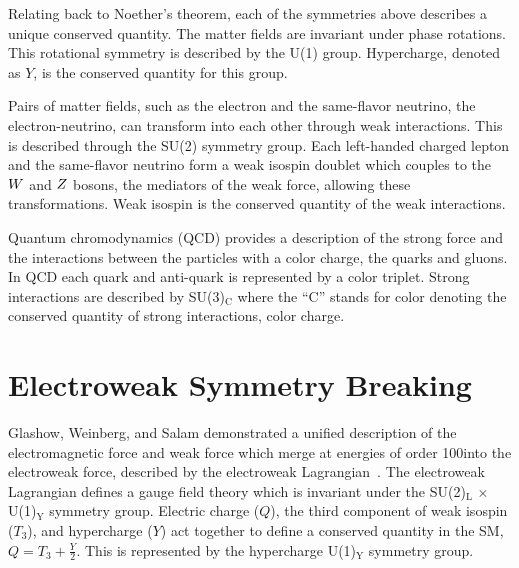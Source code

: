 
Relating back to Noether's theorem, each of the symmetries above describes a unique conserved
quantity. The matter fields are invariant under phase rotations. This rotational symmetry is described by the U(1) group.
Hypercharge, denoted as $Y$, is the conserved quantity for this group.

Pairs of matter fields, such as the electron and the same-flavor neutrino, the electron-neutrino, can transform into each other 
through weak interactions. This is described through the SU(2) symmetry group. Each left-handed charged lepton 
and the same-flavor neutrino form a weak isospin doublet which
couples to the $W$ and $Z$ bosons, the mediators of the weak force, allowing these transformations.
Weak isospin is the conserved quantity of the weak interactions.

Quantum chromodynamics (QCD) provides a description of the strong force and the interactions
between the particles with a color charge, the quarks and gluons. In QCD each quark and anti-quark
is represented by a color triplet. Strong interactions are described by SU(3)$_{\text{C}}$
where the ``C'' stands for color denoting the conserved quantity of strong interactions,
color charge.



\section{Electroweak Symmetry Breaking}
Glashow, Weinberg, and Salam demonstrated a unified description of the electromagnetic force 
and weak force which merge at energies of order 100\GeV into the electroweak force,
described by the electroweak Lagrangian~\cite{Glashow:1961tr,SM1,SM3}.
The electroweak Lagrangian defines a gauge field theory which is 
invariant under the SU(2)$_{\text{L}} \, \times \, $U(1)$_{\text{Y}}$ symmetry group. 
Electric charge ($Q$), the third component of weak isospin ($T_{3}$), and hypercharge ($Y$) act together to define a conserved 
quantity in the SM, $Q = T_{3} + \frac{Y}{2}$. This is represented by the
hypercharge U(1)$_{\text{Y}}$ symmetry group.

